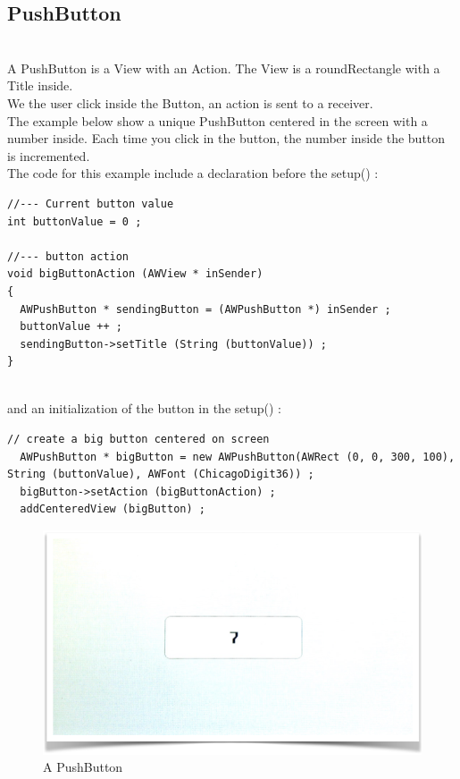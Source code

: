 \documentclass[a4paper,11pt]{extarticle}
\begin{document}
\newpage
\subsection{PushButton}

~\\ A PushButton is a View with an Action. The View is a roundRectangle with a Title inside.
~\\ We the user click inside the Button, an action is sent to a receiver.
~\\ The example below show a unique PushButton centered in the screen with a number inside. Each time you click in the button, the number inside the button is incremented.
~\\ The code for this example include a declaration before the setup() :

\begin{lstlisting}[language=Arduinonl]
//--- Current button value
int buttonValue = 0 ;

//--- button action
void bigButtonAction (AWView * inSender)
{
  AWPushButton * sendingButton = (AWPushButton *) inSender ;
  buttonValue ++ ;
  sendingButton->setTitle (String (buttonValue)) ;
}
\end{lstlisting}

~\\ and an initialization of the button in the setup() :
\begin{lstlisting}[language=Arduinonl]
 // create a big button centered on screen
  AWPushButton * bigButton = new AWPushButton(AWRect (0, 0, 300, 100), String (buttonValue), AWFont (ChicagoDigit36)) ;
  bigButton->setAction (bigButtonAction) ;
  addCenteredView (bigButton) ;
\end{lstlisting}

\begin{figure}[htbp]
   \centering
   \includegraphics[scale=0.55]{AWFig10.png} 
   \caption{A PushButton}
   \label{fig: 10}
\end{figure}
\end{document}
